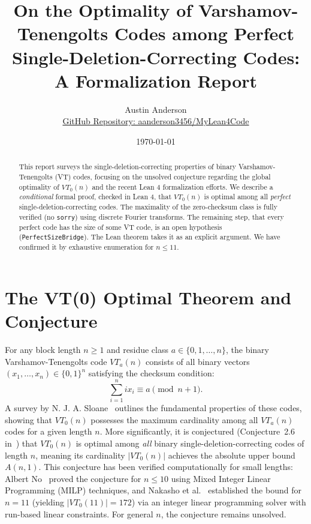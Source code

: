 \documentclass[11pt,a4paper]{article}
\title{On the Optimality of Varshamov-Tenengolts Codes among Perfect Single-Deletion-Correcting Codes: A Formalization Report}
\author{Austin Anderson \\ \small\href{https://github.com/aanderson3456/MyLean4Code}{GitHub Repository: aanderson3456/MyLean4Code}}
\date{\today}
\theoremstyle{definition}
\begin{document}
\maketitle

\begin{abstract}
This report surveys the single-deletion-correcting properties of binary Varshamov-Tenengolts (VT) codes, focusing on the unsolved conjecture regarding the global optimality of $VT_0(n)$ and the recent Lean 4 formalization efforts. We describe a \emph{conditional} formal proof, checked in Lean 4, that $VT_0(n)$ is optimal among all \emph{perfect} single-deletion-correcting codes. The maximality of the zero-checksum class is fully verified (no \texttt{sorry}) using discrete Fourier transforms. The remaining step, that every perfect code has the size of some VT code, is an open hypothesis (\texttt{PerfectSizeBridge}). The Lean theorem takes it as an explicit argument. We have confirmed it by exhaustive enumeration for $n \le 11$.
\end{abstract}

\section{The VT(0) Optimal Theorem and Conjecture}
For any block length $n \ge 1$ and residue class $a \in \{0, 1, \dots, n\}$, the binary Varshamov-Tenengolts code $VT_a(n)$ consists of all binary vectors $(x_1, \dots, x_n) \in \{0, 1\}^n$ satisfying the checksum condition:
\begin{equation}
\sum_{i=1}^n i x_i \equiv a \pmod{n+1}.
\end{equation}
A survey by N. J. A. Sloane~\cite{Sloane02} outlines the fundamental properties of these codes, showing that $VT_0(n)$ possesses the maximum cardinality among all $VT_a(n)$ codes for a given length $n$. More significantly, it is conjectured (Conjecture~2.6 in~\cite{Sloane02}) that $VT_0(n)$ is optimal among \emph{all} binary single-deletion-correcting codes of length $n$, meaning its cardinality $|VT_0(n)|$ achieves the absolute upper bound $A(n, 1)$. This conjecture has been verified computationally for small lengths: Albert No~\cite{No19} proved the conjecture for $n \le 10$ using Mixed Integer Linear Programming (MILP) techniques, and Nakasho et al.~\cite{Nakasho23} established the bound for $n = 11$ (yielding $|VT_0(11)| = 172$) via an integer linear programming solver with run-based linear constraints. For general $n$, the conjecture remains unsolved.
\end{document}
